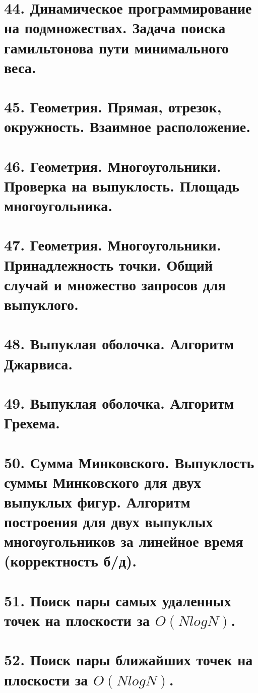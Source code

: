 \section{44. Динамическое программирование на подмножествах. Задача поиска гамильтонова пути минимального веса.}


\section{45. Геометрия. Прямая, отрезок, окружность. Взаимное расположение.}


\section{46. Геометрия. Многоугольники. Проверка на выпуклость. Площадь многоугольника.}


\section{47. Геометрия. Многоугольники. Принадлежность точки. Общий случай и множество запросов для
выпуклого.}


\section{48. Выпуклая оболочка. Алгоритм Джарвиса.}


\section{49. Выпуклая оболочка. Алгоритм Грехема.}


\section{50. Сумма Минковского. Выпуклость суммы Минковского для двух выпуклых фигур. Алгоритм
построения для двух выпуклых многоугольников за линейное время (корректность б/д).}


\section{51. Поиск пары самых удаленных точек на плоскости за $O(N log N)$.}


\section{52. Поиск пары ближайших точек на плоскости за $O(N log N)$.}

